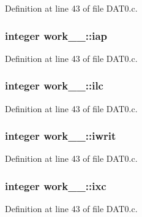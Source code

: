 Definition at line 43 of file D\+A\+T0.\+c.

\subsubsection[{\texorpdfstring{iap}{iap}}]{\setlength{\rightskip}{0pt plus 5cm}integer work\+\_\+\_\+\+::iap}\hypertarget{structwork__1___acf59d0d75ef883ea71e3f4d50c70ca95}{}\label{structwork__1___acf59d0d75ef883ea71e3f4d50c70ca95}


Definition at line 43 of file D\+A\+T0.\+c.

\subsubsection[{\texorpdfstring{ilc}{ilc}}]{\setlength{\rightskip}{0pt plus 5cm}integer work\+\_\+\_\+\+::ilc}\hypertarget{structwork__1___aed36903b9bf6f1639a1175f64963f24a}{}\label{structwork__1___aed36903b9bf6f1639a1175f64963f24a}


Definition at line 43 of file D\+A\+T0.\+c.

\subsubsection[{\texorpdfstring{iwrit}{iwrit}}]{\setlength{\rightskip}{0pt plus 5cm}integer work\+\_\+\_\+\+::iwrit}\hypertarget{structwork__1___ae3baf791cc5851ae41a89032931c0a83}{}\label{structwork__1___ae3baf791cc5851ae41a89032931c0a83}


Definition at line 43 of file D\+A\+T0.\+c.

\subsubsection[{\texorpdfstring{ixc}{ixc}}]{\setlength{\rightskip}{0pt plus 5cm}integer work\+\_\+\_\+\+::ixc}\hypertarget{structwork__1___a83bf1c7389b03f7c671baff0321065ef}{}\label{structwork__1___a83bf1c7389b03f7c671baff0321065ef}


Definition at line 43 of file D\+A\+T0.\+c.


